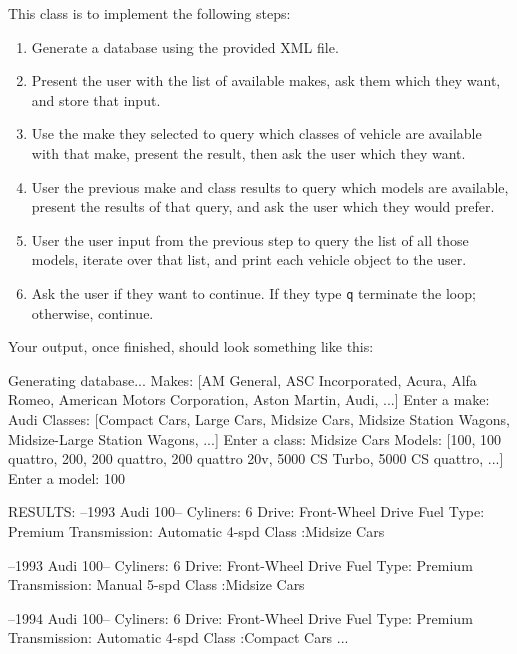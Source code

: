 This class is to implement the following steps:
\begin{enumerate}
    \item Generate a database using the provided XML file.
    \item Present the user with the list of available makes, ask them which they want, and store that input.
    \item Use the make they selected to query which classes of vehicle are available with that make, present the result, then ask the user which they want.
    \item User the previous make and class results to query which models are available, present the results of that query, and ask the user which they would prefer.
    \item User the user input from the previous step to query the list of all those models, iterate over that list, and print each vehicle object to the user.
    \item Ask the user if they want to continue. If they type \lstinline|q| terminate the loop; otherwise, continue.
\end{enumerate}
Your output, once finished, should look something like this:

\begin{shell}
Generating database...
Makes: [AM General, ASC Incorporated, Acura, Alfa Romeo, American Motors Corporation, Aston Martin, Audi, ...]
Enter a make: Audi
Classes: [Compact Cars, Large Cars, Midsize Cars, Midsize Station Wagons, Midsize-Large Station Wagons, ...]
Enter a class: Midsize Cars
Models: [100, 100 quattro, 200, 200 quattro, 200 quattro 20v, 5000 CS Turbo, 5000 CS quattro, ...]
Enter a model: 100

RESULTS:
--1993 Audi 100--
Cyliners: 6
Drive: Front-Wheel Drive
Fuel Type: Premium
Transmission: Automatic 4-spd
Class :Midsize Cars

--1993 Audi 100--
Cyliners: 6
Drive: Front-Wheel Drive
Fuel Type: Premium
Transmission: Manual 5-spd
Class :Midsize Cars

--1994 Audi 100--
Cyliners: 6
Drive: Front-Wheel Drive
Fuel Type: Premium
Transmission: Automatic 4-spd
Class :Compact Cars
...
\end{shell}
